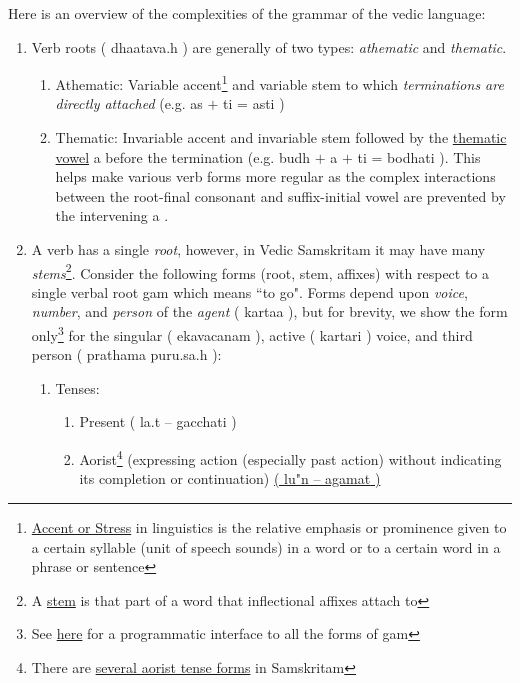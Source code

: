 \documentclass[a4paper, 12pt]{article}
\newcommand \sans[1]{
    \textsanskrit{#1}
}
\begin{document}
    Here is an overview of the complexities of the grammar of the vedic language:
    \begin{enumerate}
        \item Verb roots (\sans{dhaatava.h}) are generally of two types: \emph{athematic} and \emph{thematic}. 
            \begin{enumerate}
                \item Athematic: Variable accent\footnote{\href{https://en.wikipedia.org/wiki/Stress_(linguistics)}{Accent or Stress} in linguistics is the relative emphasis or prominence given to a certain syllable (unit of speech sounds) in a word or to a certain word in a phrase or sentence} and variable stem to which \emph{terminations are directly attached} (e.g. \sans{as $+$ ti = asti})
                \item Thematic: Invariable accent and invariable stem followed by the \href{https://en.wikipedia.org/wiki/Thematic_vowel}{thematic vowel} \sans{a} before the termination (e.g. \sans{budh $+$ a $+$ ti = bodhati}). This helps make various verb forms more regular as the complex interactions between the root-final consonant and suffix-initial vowel are prevented by the intervening \sans{a}.
            \end{enumerate}
        \item A verb has a single \emph{root}, however, in Vedic Samskritam it may have many \emph{stems}\footnote{A \href{https://en.wikipedia.org/wiki/Word_stem\#Usage}{stem} is that part of a word that inflectional affixes attach to}. Consider the following forms (root, stem, affixes) with respect to a single verbal root \sans{gam} which means ``to go". Forms depend upon \emph{voice}, \emph{number}, and \emph{person} of the \emph{agent} (\sans{kartaa}), but for brevity, we show the form only\footnote{See \href{https://sanskrit.inria.fr/cgi-bin/SKT/sktconjug.cgi?q=gam;c=1;font=roma}{here} for a programmatic interface to all the forms of \sans{gam}} for the singular (\sans{ekavacanam}), active (\sans{kartari}) voice, and third person (\sans{prathama puru.sa.h}):
            \begin{enumerate}
                \item Tenses:
                    \begin{enumerate}
                        \item Present (\sans{la.t -- gacchati})
                        \item Aorist\footnote{There are \href{https://avagraha.wordpress.com/2012/05/25/sanskrit-aorist/}{several aorist tense forms} in Samskritam} (expressing action (especially past action) without indicating its completion or continuation) \href{https://pages.shanti.virginia.edu/Sanskrit_Language_Tools/verbs/the-aorist/}{(\sans{lu"n -- agamat})}

\end{enumerate}
\end{enumerate}
\end{enumerate}
\end{document}
